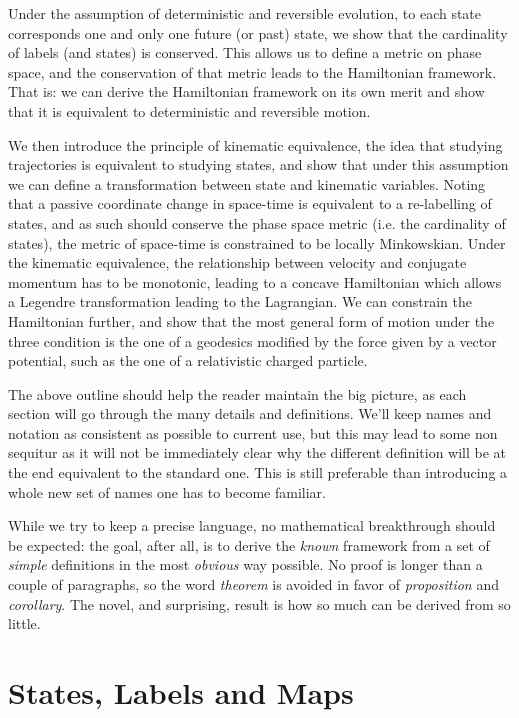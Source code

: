 \documentclass[aps,pra,10pt,twocolumn,floatfix,nofootinbib]{revtex4-1}
\theoremstyle{definition}
\begin{document}
Under the assumption of deterministic and reversible evolution, to each state corresponds one and only one future (or past) state, we show that the cardinality of labels (and states) is conserved. This allows us to define a metric on phase space, and the conservation of that metric leads to the Hamiltonian framework. That is: we can derive the Hamiltonian framework on its own merit and show that it is equivalent to deterministic and reversible motion.

We then introduce the principle of kinematic equivalence, the idea that studying trajectories is equivalent to studying states, and show that under this assumption we can define a transformation between state and kinematic variables. Noting that a passive coordinate change in space-time is equivalent to a re-labelling of states, and as such should conserve the phase space metric (i.e. the cardinality of states), the metric of space-time is constrained to be locally Minkowskian. Under the kinematic equivalence, the relationship between velocity and conjugate momentum has to be monotonic, leading to a concave Hamiltonian which allows a Legendre transformation leading to the Lagrangian. We can constrain the Hamiltonian further, and show that the most general form of motion under the three condition is the one of a geodesics modified by the force given by a vector potential, such as the one of a relativistic charged particle.

The above outline should help the reader maintain the big picture, as each section will go through the many details and definitions. We'll keep names and notation as consistent as possible to current use, but this may lead to some non sequitur as it will not be immediately clear why the different definition will be at the end equivalent to the standard one. This is still preferable than introducing a whole new set of names one has to become familiar.

While we try to keep a precise language, no mathematical breakthrough should be expected: the goal, after all, is to derive the \emph{known} framework from a set of \emph{simple} definitions in the most \emph{obvious} way possible. No proof is longer than a couple of paragraphs, so the word \emph{theorem} is avoided in favor of \emph{proposition} and \emph{corollary}. The novel, and surprising, result is how so much can be derived from so little.

\section{States, Labels and Maps}
\end{document}
